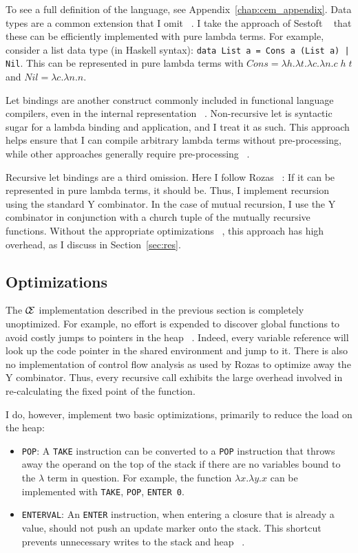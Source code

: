 To see a full definition of the language, see Appendix~\ref{chap:cem_appendix}.
Data types are a common extension that I omit ~\cite{jonesstg,boquist1997grin}.
I take the approach of Sestoft ~\cite{sestoft} that these can be efficiently
implemented with pure lambda terms. For example, consider a list data type (in
Haskell syntax): \texttt{data List a = Cons a (List a) | Nil}. This can be
represented in pure lambda terms with $\mathit{Cons} = \lambda h.\lambda t.\lambda
c.\lambda n.c \; h \; t$ and $\mathit{Nil} = \lambda c.\lambda n.n$. 

Let bindings are another construct commonly included in functional
language compilers, even in the internal representation
~\cite{boquist1997grin,jonesstg}.  Non-recursive let is syntactic sugar for a
lambda binding and application, and I treat it as such. This approach helps
ensure that I can compile arbitrary lambda terms without pre-processing, while
other approaches generally require pre-processing ~\cite{sestoft,TIM}.

Recursive let bindings are a third omission. Here I follow Rozas
~\cite{rozas1992taming}: If it can be represented in pure lambda terms, it should
be. Thus, I implement recursion using the standard Y combinator. In the case of
mutual recursion, I use the Y combinator in conjunction with a church tuple of
the mutually recursive functions. Without the appropriate optimizations
~\cite{rozas1992taming}, this approach has high overhead, as I discuss in
Section~\ref{sec:res}.

\subsection{Optimizations}

The $\mathcal{C} \mskip -4mu \mathcal{E}$ implementation described in the previous section is 
completely unoptimized. For example, no effort is expended to
discover global functions to avoid costly jumps to pointers in the heap
~\cite{jonesstg}. Indeed, every variable reference will look up the code pointer
in the shared environment and jump to it. There is also no implementation of 
control flow analysis as used by Rozas to optimize away the Y combinator.  Thus,
every recursive call exhibits the large overhead involved in re-calculating the
fixed point of the function.  

I do, however, implement two basic optimizations, primarily to reduce the load
on the heap:

\begin{itemize}
\item \texttt{POP}: A \texttt{TAKE} instruction can be converted to a \texttt{POP}
instruction that throws away the operand on the top of the stack if there are no
variables bound to the $\lambda$ term in question. For example, the function
$\lambda x.\lambda y.x$ can be implemented with \texttt{TAKE}, \texttt{POP},
\texttt{ENTER 0}.  
\item \texttt{ENTERVAL}: An \texttt{ENTER} instruction, when entering a
closure that is already a value, should not push an update marker onto the
stack. This shortcut prevents unnecessary writes to the stack and heap
~\cite{jonesstg,lkm,sestoft}.  
\end{itemize}

